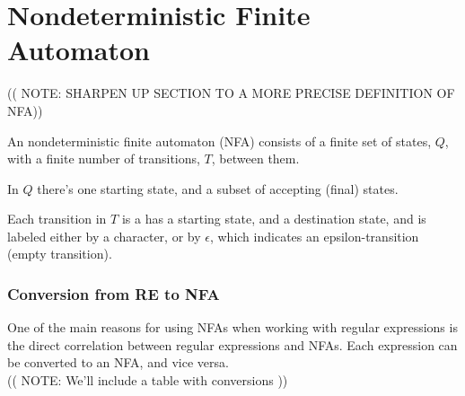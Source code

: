 \section{Nondeterministic Finite Automaton}
(( NOTE: SHARPEN UP SECTION TO A MORE PRECISE DEFINITION OF NFA))

\begin{mydef}
An nondeterministic finite automaton (NFA) consists of a finite set of states, $Q$, with a finite number of transitions, $T$, between them.


In $Q$ there's one starting state, and a subset of accepting (final) states.

Each transition in $T$ is a has a starting state, and a destination state, and is labeled either by a character, or by $\epsilon$, which indicates an epsilon-transition (empty transition).
\end{mydef}

\subsubsection{Conversion from RE to NFA}
One of the main reasons for using NFAs when working with regular expressions is the direct correlation between regular expressions and NFAs. Each expression can be converted to an NFA, and vice versa.
\\
(( NOTE: We'll include a table with conversions ))
\\

